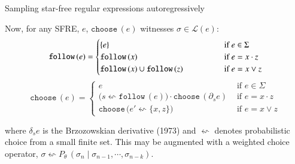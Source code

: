 \documentclass{beamer}
\begin{document}
\begin{frame}{Sampling star-free regular expressions autoregressively}

  Now, for any SFRE, \(e\), $\texttt{choose}\,(e)$ witnesses $\sigma \in \mathcal{L}(e)$:
  \begin{equation*}
    \texttt{follow}\,(e) = \begin{cases}
           \{e\}                                        &\hspace{1.3cm}\text{ if } e \in \Sigma \\
           \texttt{follow}\,(x)                         &\hspace{1.3cm}\text{ if } e = x \cdot z\\
           \texttt{follow}\,(x)\cup\texttt{follow}\,(z) &\hspace{1.3cm}\text{ if } e = x \lor z
    \end{cases}
  \end{equation*}
  \begin{equation*}\label{eq:choose}
    \texttt{choose}\,(e) = \begin{cases}
         e &\text{ if } e \in \Sigma \\
         \big(s \leftsquigarrow \texttt{follow}\,(e)\big)\cdot \texttt{choose}\,(\partial_s e) &\text{ if } e = x \cdot z\\
         \texttt{choose}\,\big(e' \leftsquigarrow \{x, z\}\big) &\text{ if } e = x \lor z
    \end{cases}
  \end{equation*}
\vspace{0.2cm}

  where $\delta_s e$ is the Brzozowskian derivative (1973) and $\leftsquigarrow$ denotes probabilistic choice from a small finite set. This may be augmented with a weighted choice operator, $\sigma \leftsquigarrow P_\theta\,(\sigma_{n} \mid  \sigma_{n-1}, \cdots, \sigma_{n - k})$.
\end{frame}
\end{document}
